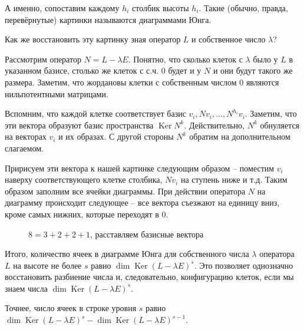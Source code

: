 \documentclass[10pt,a4paper,oneside]{book} %
\theoremstyle{definition}
\DeclareMathOperator{\Ker}{Ker}
\begin{document}
А именно, сопоставим каждому $h_i$ столбик высоты $h_i$. Такие (обычно, правда, перевёрнутые) картинки называются диаграммами Юнга.

Как же восстановить эту картинку зная оператор $L$ и собственное число $\lambda$?

Рассмотрим оператор $N=L-\lambda E$. Понятно, что сколько клеток с $\lambda$ было у $L$ в указанном базисе, столько же клеток с с.ч. 0 будет и у $N$ и они будут такого же размера.
Заметим, что жордановы клетки с собственным числом 0 являются нильпотентными матрицами.



 Вспомним, что каждой клетке соответствует базис $v_i, N v_i, \dots,N^{h_i} v_i$. Заметим, что эти вектора образуют базис пространства $\Ker N^k$. Действительно, $N^k$ обнуляется на векторах $v_i$ и их образах. С другой стороны $N^k$ обратим на дополнительном слагаемом.

 Пририсуем эти вектора к нашей картинке следующим образом -- поместим $v_i$ наверху соответствующего клетке  столбика, $N v_i$ на ступень ниже и т.д. Таким образом заполним все ячейки диаграммы. При действии оператора $N$ на диаграмму происходит следующее -- все вектора съезжают на единицу вниз, кроме самых нижних, которые переходят в $0$.
\begin{figure}[hhh]
\begin{center}
\end{center}
\caption{$8=3+2+2+1$, расставляем базисные вектора}
\end{figure}
Итого, количество ячеек в диаграмме Юнга для собственного числа $\lambda$ оператора $L$ на высоте не более $s$ равно $\dim \Ker(L - \lambda E)^s $.
Это  позволяет однозначно восстановить разбиение числа и, следовательно, конфигурацию клеток, если мы знаем числа $\dim \Ker(L - \lambda E)^s $.

Точнее, число ячеек в строке уровня $s$ равно $\dim \Ker(L - \lambda E)^s -\dim \Ker(L - \lambda E)^{s-1} $.
\end{document}
